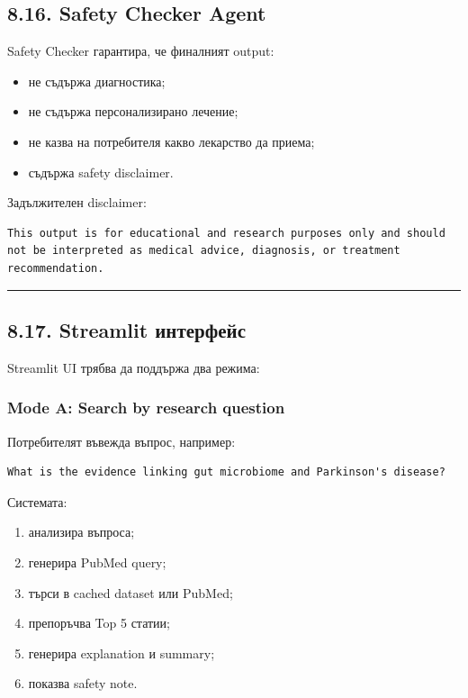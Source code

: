 \documentclass[12pt,a4paper]{article}
\providecommand{\tightlist}{\setlength{\itemsep}{0pt}\setlength{\parskip}{0pt}}
\begin{document}
\subsection{8.16. Safety Checker Agent}\label{safety-checker-agent}

Safety Checker гарантира, че финалният output:

\begin{itemize}
\tightlist
\item
  не съдържа диагностика;
\item
  не съдържа персонализирано лечение;
\item
  не казва на потребителя какво лекарство да приема;
\item
  съдържа safety disclaimer.
\end{itemize}

Задължителен disclaimer:

\begin{verbatim}
This output is for educational and research purposes only and should not be interpreted as medical advice, diagnosis, or treatment recommendation.
\end{verbatim}

\vspace{0.5em}\hrule\vspace{1.0em}

\subsection{8.17. Streamlit интерфейс}\label{streamlit-ux438ux43dux442ux435ux440ux444ux435ux439ux441}

Streamlit UI трябва да поддържа два режима:

\subsubsection{Mode A: Search by research question}\label{mode-a-search-by-research-question}

Потребителят въвежда въпрос, например:

\begin{verbatim}
What is the evidence linking gut microbiome and Parkinson's disease?
\end{verbatim}

Системата:

\begin{enumerate}
\def\labelenumi{\arabic{enumi}.}
\tightlist
\item
  анализира въпроса;
\item
  генерира PubMed query;
\item
  търси в cached dataset или PubMed;
\item
  препоръчва Top 5 статии;
\item
  генерира explanation и summary;
\item
  показва safety note.
\end{enumerate}
\end{document}
